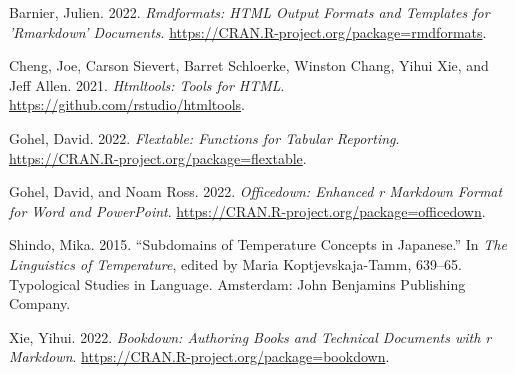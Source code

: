 \documentclass[
]{article}
\newlength{\cslhangindent}
\newlength{\cslentryspacingunit} %
\newenvironment{CSLReferences}[2] %
 {%
  \setlength{\parindent}{0pt}
  \ifodd #1
  \let\oldpar\par
  \def\par{\hangindent=\cslhangindent\oldpar}
  \fi
  \setlength{\parskip}{#2\cslentryspacingunit}
 }%
 {}
\begin{document}
\hypertarget{refs}{}
\begin{CSLReferences}{1}{0}
\leavevmode{}%
Barnier, Julien. 2022. \emph{Rmdformats: HTML Output Formats and Templates for 'Rmarkdown' Documents}. \url{https://CRAN.R-project.org/package=rmdformats}.

\leavevmode{}%
Cheng, Joe, Carson Sievert, Barret Schloerke, Winston Chang, Yihui Xie, and Jeff Allen. 2021. \emph{Htmltools: Tools for HTML}. \url{https://github.com/rstudio/htmltools}.

\leavevmode{}%
Gohel, David. 2022. \emph{Flextable: Functions for Tabular Reporting}. \url{https://CRAN.R-project.org/package=flextable}.

\leavevmode{}%
Gohel, David, and Noam Ross. 2022. \emph{Officedown: Enhanced r Markdown Format for Word and PowerPoint}. \url{https://CRAN.R-project.org/package=officedown}.

\leavevmode{}%
Shindo, Mika. 2015. {``Subdomains of Temperature Concepts in {Japanese}.''} In \emph{The {Linguistics} of {Temperature}}, edited by Maria Koptjevskaja-Tamm, 639--65. Typological {Studies} in {Language}. {Amsterdam}: {John Benjamins Publishing Company}.

\leavevmode{}%
Xie, Yihui. 2022. \emph{Bookdown: Authoring Books and Technical Documents with r Markdown}. \url{https://CRAN.R-project.org/package=bookdown}.

\end{CSLReferences}
\end{document}
